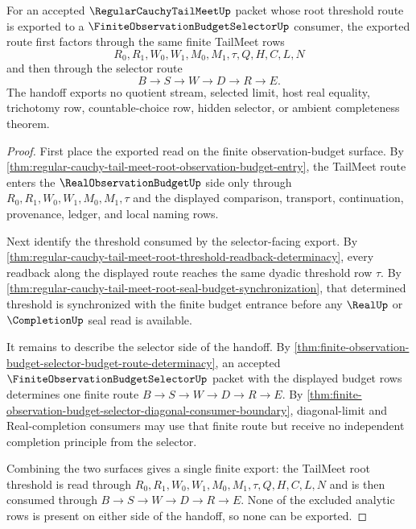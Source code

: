 \begin{theorem}
\label{thm:regular-cauchy-tail-meet-observation-budget-selector-handoff}
For an accepted $\RegularCauchyTailMeetUp$ packet whose root threshold route is exported to a $\FiniteObservationBudgetSelectorUp$ consumer, the exported route first factors through the same finite TailMeet rows
$$
R_0,R_1,W_0,W_1,M_0,M_1,\tau,Q,H,C,L,N
$$
and then through the selector route
$$
B \to S \to W \to D \to R \to E.
$$
The handoff exports no quotient stream, selected limit, host real equality, trichotomy row, countable-choice row, hidden selector, or ambient completeness theorem.
\end{theorem}
\begin{proof}
First place the exported read on the finite observation-budget surface. By \autoref{thm:regular-cauchy-tail-meet-root-observation-budget-entry}, the TailMeet route enters the $\RealObservationBudgetUp$ side only through $R_0,R_1,W_0,W_1,M_0,M_1,\tau$ and the displayed comparison, transport, continuation, provenance, ledger, and local naming rows.

Next identify the threshold consumed by the selector-facing export. By \autoref{thm:regular-cauchy-tail-meet-root-threshold-readback-determinacy}, every readback along the displayed route reaches the same dyadic threshold row $\tau$. By \autoref{thm:regular-cauchy-tail-meet-root-seal-budget-synchronization}, that determined threshold is synchronized with the finite budget entrance before any $\RealUp$ or $\CompletionUp$ seal read is available.

It remains to describe the selector side of the handoff. By \autoref{thm:finite-observation-budget-selector-budget-route-determinacy}, an accepted $\FiniteObservationBudgetSelectorUp$ packet with the displayed budget rows determines one finite route $B \to S \to W \to D \to R \to E$. By \autoref{thm:finite-observation-budget-selector-diagonal-consumer-boundary}, diagonal-limit and Real-completion consumers may use that finite route but receive no independent completion principle from the selector.

Combining the two surfaces gives a single finite export: the TailMeet root threshold is read through $R_0,R_1,W_0,W_1,M_0,M_1,\tau,Q,H,C,L,N$ and is then consumed through $B \to S \to W \to D \to R \to E$. None of the excluded analytic rows is present on either side of the handoff, so none can be exported.
\end{proof}

